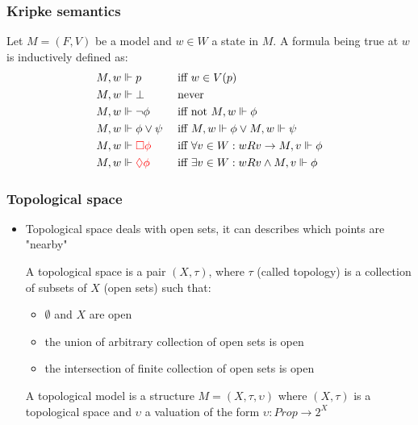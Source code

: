 \documentclass[hyperref={pdfpagelabels=false},t,10pt]{beamer}
\begin{document}
\begin{frame}
  \frametitle{Kripke semantics}

  \begin{definition}
      Let $M = (F,V)$ be a model and $w \in W$ a state in $M$. A formula being true at $w$ is inductively defined as: 
      \begin{align*}
        M, w &\Vdash p &&\text{ iff } w \in V(p) \\
        M, w &\Vdash \bot  &&\text{ never } \\
        M, w &\Vdash \neg \phi &&\text{ iff not } M, w \Vdash \phi \\ 
        M, w &\Vdash \phi \lor \psi &&\text{ iff } M,w \Vdash \phi \lor M,w \Vdash \psi \\
        M, w &\Vdash \textcolor{red}{\Box \phi} &&\text{ iff } \forall v \in W : wRv \rightarrow M, v \Vdash \phi \\
        M, w &\Vdash \textcolor{red}{\lozenge \phi} &&\text{ iff } \exists v \in W : wRv \land M,v \Vdash \phi
    \end{align*}  
  \end{definition}


  
\end{frame}



\begin{frame}
  \frametitle{Topological space}
  \begin{itemize}
    \item Topological space deals with open sets, it can describes which points are "nearby" \pause %
    \begin{definition}
             A topological space is a pair $(X, \tau)$, where $\tau$ (called topology) is a collection of subsets of $X$ (open sets) such that: \pause
        \begin{itemize}
          \item $\emptyset$ and $X$ are open
          \item the union of arbitrary collection of open sets is open
          \item the intersection of finite collection of open sets is open
        \end{itemize} \pause
          A topological model is a structure $M = (X,\tau, \upsilon)$ where $(X, \tau)$ is a topological space and $\upsilon$ a valuation of the form $\upsilon : Prop \rightarrow 2^X$  
    \end{definition}
    \end{itemize}
    \end{frame}
\end{document}
